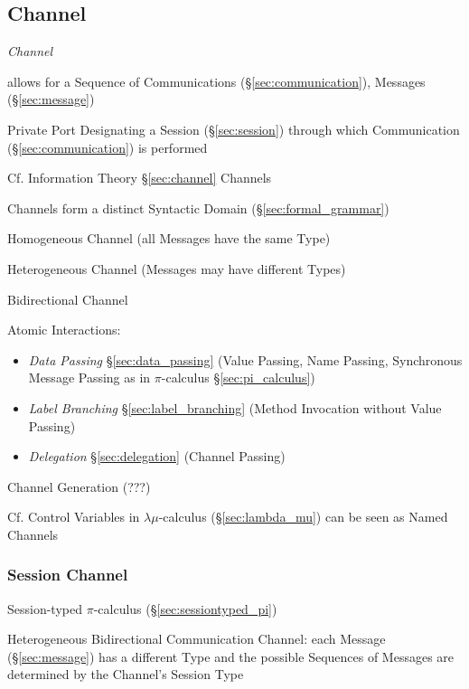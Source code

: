 \subsection{Channel}\label{sec:process_channel}

\emph{Channel}

allows for a Sequence of Communications (\S\ref{sec:communication}),
Messages (\S\ref{sec:message})

Private Port Designating a Session (\S\ref{sec:session}) through which
Communication (\S\ref{sec:communication}) is performed
\cite{honda-vasconcelos-kubo98}

\fist Cf. Information Theory \S\ref{sec:channel} Channels

Channels form a distinct Syntactic Domain (\S\ref{sec:formal_grammar})
\cite{honda-vasconcelos-kubo98}

Homogeneous Channel (all Messages have the same Type)

Heterogeneous Channel (Messages may have different Types)

Bidirectional Channel

Atomic Interactions:
\begin{itemize}
  \item \emph{Data Passing} \S\ref{sec:data_passing} (Value Passing,
    Name Passing, Synchronous Message Passing as in $\pi$-calculus
    \S\ref{sec:pi_calculus})
  \item \emph{Label Branching} \S\ref{sec:label_branching} (Method
    Invocation without Value Passing)
  \item \emph{Delegation} \S\ref{sec:delegation} (Channel Passing)
\end{itemize}

Channel Generation (???)

\fist Cf. Control Variables in $\lambda\mu$-calculus
(\S\ref{sec:lambda_mu}) can be seen as Named Channels



\subsubsection{Session Channel}\label{sec:session_channel}

Session-typed $\pi$-calculus (\S\ref{sec:sessiontyped_pi})

Heterogeneous Bidirectional Communication Channel: each Message
(\S\ref{sec:message}) has a different Type and the possible Sequences
of Messages are determined by the Channel's Session Type
\cite{neubauer-thiemann04}



